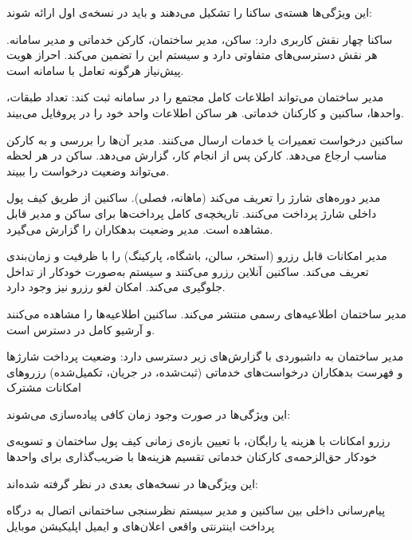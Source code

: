 


این ویژگی‌ها هسته‌ی ساکنا را تشکیل می‌دهند و باید در نسخه‌ی اول ارائه شوند:

ساکنا چهار نقش کاربری دارد: ساکن، مدیر ساختمان، کارکن خدماتی و مدیر سامانه.
هر نقش دسترسی‌های متفاوتی دارد و سیستم  این را تضمین می‌کند.
احراز هویت پیش‌نیاز هرگونه تعامل با سامانه است.

مدیر ساختمان می‌تواند اطلاعات کامل مجتمع را در سامانه ثبت کند:
تعداد طبقات، واحدها، ساکنین و کارکنان خدماتی.
هر ساکن اطلاعات واحد خود را در پروفایل می‌بیند.

ساکنین درخواست تعمیرات یا خدمات ارسال می‌کنند.
مدیر آن‌ها را بررسی و به کارکن مناسب ارجاع می‌دهد.
کارکن پس از انجام کار، گزارش می‌دهد.
ساکن در هر لحظه می‌تواند وضعیت درخواست را ببیند.

مدیر دوره‌های شارژ را تعریف می‌کند (ماهانه، فصلی).
ساکنین از طریق کیف پول داخلی شارژ پرداخت می‌کنند.
تاریخچه‌ی کامل پرداخت‌ها برای ساکن و مدیر قابل مشاهده است.
مدیر وضعیت بدهکاران را گزارش می‌گیرد.

مدیر امکانات قابل رزرو (استخر، سالن، باشگاه، پارکینگ) را با ظرفیت و زمان‌بندی تعریف می‌کند.
ساکنین آنلاین رزرو می‌کنند و سیستم به‌صورت خودکار از تداخل جلوگیری می‌کند.
امکان لغو رزرو نیز وجود دارد.

مدیر ساختمان اطلاعیه‌های رسمی منتشر می‌کند.
ساکنین اطلاعیه‌ها را مشاهده می‌کنند و آرشیو کامل در دسترس است.

مدیر ساختمان به داشبوردی با گزارش‌های زیر دسترسی دارد:
 وضعیت پرداخت شارژها و فهرست بدهکاران
 درخواست‌های خدماتی (ثبت‌شده، در جریان، تکمیل‌شده)
 رزروهای امکانات مشترک


این ویژگی‌ها در صورت وجود زمان کافی پیاده‌سازی می‌شوند:

 رزرو امکانات با هزینه یا رایگان، با تعیین بازه‌ی زمانی
 کیف پول ساختمان و تسویه‌ی خودکار حق‌الزحمه‌ی کارکنان خدماتی
 تقسیم هزینه‌ها با ضریب‌گذاری برای واحدها


این ویژگی‌ها در نسخه‌های بعدی در نظر گرفته شده‌اند:

 پیام‌رسانی داخلی بین ساکنین و مدیر
 سیستم نظرسنجی ساختمانی
 اتصال به درگاه پرداخت اینترنتی واقعی
 اعلان‌های  و ایمیل
 اپلیکیشن موبایل


